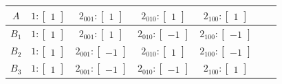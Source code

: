 \documentclass[fleqn,8pt,landscape]{jsarticle}
\begin{document}
\begin{longtable}{ccccccc}
$ A $ & $ 1:\begin{bmatrix} 1 \end{bmatrix} $ & $ 2{}_{001}:\begin{bmatrix} 1 \end{bmatrix} $ & $ 2{}_{010}:\begin{bmatrix} 1 \end{bmatrix} $ & $ 2{}_{100}:\begin{bmatrix} 1 \end{bmatrix} $ \\ \hline
$ B_{1} $ & $ 1:\begin{bmatrix} 1 \end{bmatrix} $ & $ 2{}_{001}:\begin{bmatrix} 1 \end{bmatrix} $ & $ 2{}_{010}:\begin{bmatrix} -1 \end{bmatrix} $ & $ 2{}_{100}:\begin{bmatrix} -1 \end{bmatrix} $ \\ \hline
$ B_{2} $ & $ 1:\begin{bmatrix} 1 \end{bmatrix} $ & $ 2{}_{001}:\begin{bmatrix} -1 \end{bmatrix} $ & $ 2{}_{010}:\begin{bmatrix} 1 \end{bmatrix} $ & $ 2{}_{100}:\begin{bmatrix} -1 \end{bmatrix} $ \\ \hline
$ B_{3} $ & $ 1:\begin{bmatrix} 1 \end{bmatrix} $ & $ 2{}_{001}:\begin{bmatrix} -1 \end{bmatrix} $ & $ 2{}_{010}:\begin{bmatrix} -1 \end{bmatrix} $ & $ 2{}_{100}:\begin{bmatrix} 1 \end{bmatrix} $ \\
\end{longtable}
\end{document}
